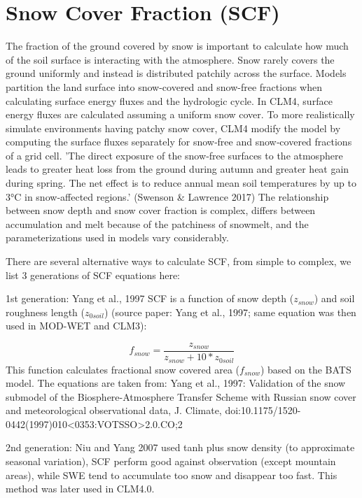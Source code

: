 \documentclass{article}
\begin{document}
\section{Snow Cover Fraction (SCF)}
The fraction of the ground covered by snow is important to calculate how much of the soil surface is interacting with the atmosphere. Snow rarely covers the ground uniformly and instead is distributed patchily across the surface. Models partition the land surface into snow-covered and snow-free fractions when calculating surface energy fluxes and the hydrologic cycle. 
In CLM4, surface energy fluxes are calculated assuming a uniform snow cover. To more realistically simulate environments having patchy snow cover, CLM4 modify the model by computing the surface fluxes separately for snow‐free and snow‐covered fractions of a grid cell. 'The direct exposure of the snow‐free surfaces to the atmosphere leads to greater heat loss from the ground during autumn and greater heat gain during spring. The net effect is to reduce annual mean soil temperatures by up to 3°C in snow‐affected regions.' (Swenson & Lawrence 2017)
The relationship between snow depth and snow cover fraction is complex, differs between accumulation and melt because of the patchiness of snowmelt, and the parameterizations used in models vary considerably.

There are several alternative ways to calculate SCF, from simple to complex, we list 3 generations of SCF equations here:

1st generation: Yang et al., 1997 SCF is a function of snow depth ($z_{snow}$) and soil roughness length ($z_{0soil}$) (source paper: Yang et al., 1997; same equation was then used in MOD-WET and CLM3):

\begin{equation}
f_{snow}= \frac{z_{snow}}{z_{snow}+10*z_{0soil}}
\end{equation}This function calculates fractional snow covered area ($f_{snow}$) based on the BATS model. The equations are taken from: Yang et al., 1997: Validation of the snow submodel of the Biosphere-Atmosphere Transfer Scheme with Russian snow cover and meteorological observational data, J. Climate, doi:10.1175/1520-0442(1997)010<0353:VOTSSO>2.0.CO;2

2nd generation: Niu and Yang 2007 used tanh plus snow density (to approximate seasonal variation), SCF perform good against observation (except mountain areas), while SWE tend to accumulate too snow and disappear too fast. This method was later used in CLM4.0. 
\end{document}
